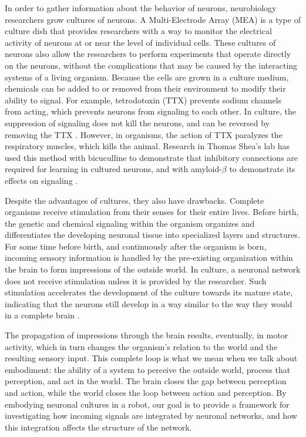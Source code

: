 \documentclass[letterpaper]{article}
\begin{document}
In order to gather information about the behavior of neurons, neurobiology researchers grow cultures of neurons.
A Multi-Electrode Array (MEA) is a type of culture dish that provides researchers with a way to monitor the electrical activity of neurons at or near the level of individual cells. 
These cultures of neurons also allow the researchers to perform experiments that operate directly on the neurons, without the complications that may be caused by the interacting systems of a living organism. 
Because the cells are grown in a culture medium, chemicals can be added to or removed from their environment to modify their ability to signal. 
For example, tetrodotoxin (TTX) prevents sodium channels from acting, which prevents neurons from signaling to each other. 
In culture, the suppression of signaling does not kill the neurons, and can be reversed by removing the TTX \cite{wagenaar2004effective}. 
However, in organisms, the action of TTX paralyzes the respiratory muscles, which kills the animal.  
Research in Thomas Shea's lab has used this method with bicuculline to demonstrate that inhibitory connections are required for learning in cultured neurons, and with amyloid-$\beta$ to demonstrate its effects on signaling \cite{lee2013rapid,shea2009optimization}. 

Despite the advantages of cultures, they also have drawbacks. 
Complete organisms receive stimulation from their senses for their entire lives. 
Before birth, the genetic and chemical signaling within the organism organizes and differentiates the developing neuronal tissue into specialized layers and structures. 
For some time before birth, and continuously after the organism is born, incoming sensory information is handled by the pre-existing organization within the brain to form impressions of the outside world. 
In culture, a neuronal network does not receive stimulation unless it is provided by the researcher. 
Such stimulation accelerates the development of the culture towards its mature state, indicating that the neurons still develop in a way similar to the way they would in a complete brain \cite{zemianek2012accelerated}.

The propagation of impressions through the brain results, eventually, in motor activity, which in turn changes the organism's relation to the world and the resulting sensory input. 
This complete loop is what we mean when we talk about embodiment: the ability of a system to perceive the outside world, process that perception, and act in the world. 
The brain closes the gap between perception and action, while the world closes the loop between action and perception. 
By embodying neuronal cultures in a robot, our goal is to provide a framework for investigating how incoming signals are integrated by neuronal networks, and how this integration affects the structure of the network. 
\end{document}
